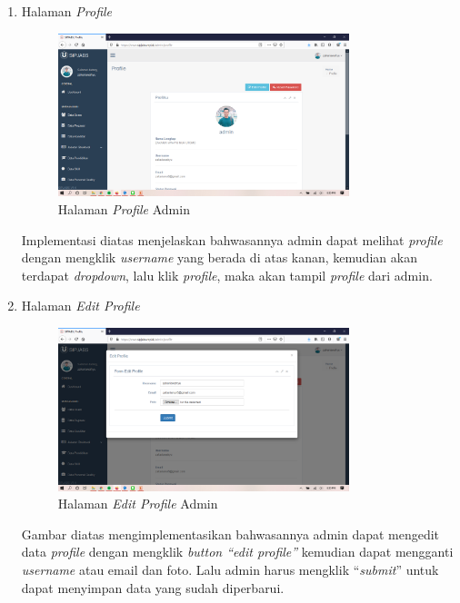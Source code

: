 \begin{enumerate}
	\newpage
	\item Halaman \textit{Profile}
	\begin{figure}
		\centering
		\includegraphics[width=0.8\textwidth]
		{pics/admin/implementasi/profile.png}
		\caption{Halaman \textit{Profile} Admin}
		\label{fig:CC10}
	\end{figure}
	Implementasi diatas menjelaskan bahwasannya admin dapat melihat \textit{profile} dengan mengklik \textit{username} yang berada di atas kanan, kemudian akan terdapat \textit{dropdown}, lalu klik \textit{profile}, maka akan tampil \textit{profile} dari admin.
	
	\item Halaman \textit{Edit Profile}
	\begin{figure}
		\centering
		\includegraphics[width=0.8\textwidth]
		{pics/admin/implementasi/editprofile.png}
		\caption{Halaman \textit{Edit Profile} Admin}
		\label{fig:CC10}
	\end{figure}
	Gambar diatas mengimplementasikan bahwasannya admin dapat mengedit data \textit{profile} dengan mengklik \textit{button “edit profile”} kemudian dapat mengganti \textit{username} atau email dan foto. Lalu admin harus mengklik “\textit{submit}” untuk dapat menyimpan data yang sudah diperbarui. 
	

\end{enumerate}
